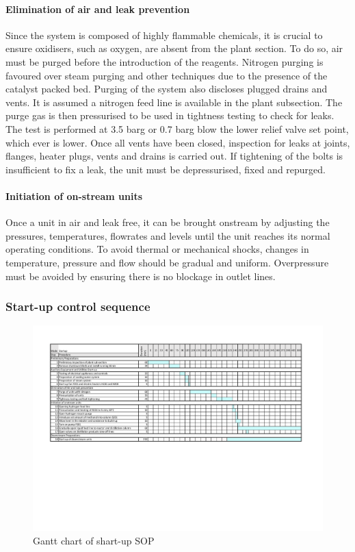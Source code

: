 \paragraph{Elimination of air and leak prevention}
Since the system is composed of highly flammable chemicals, it is crucial to ensure oxidisers, such as oxygen, are absent from the plant section. To do so, air must be purged before the introduction of the reagents. Nitrogen purging is favoured over steam purging and other techniques due to the presence of the catalyst packed bed. Purging of the system also discloses plugged drains and vents. It is assumed a nitrogen feed line is available in the plant subsection. 
The purge gas is then pressurised to be used in tightness testing to check for leaks. The test is performed at 3.5 barg or 0.7 barg blow the lower relief valve set point, which ever is lower. Once all vents have been closed, inspection for leaks at joints, flanges, heater plugs, vents and drains is carried out. If tightening of the bolts is insufficient to fix a leak, the unit must be depressurised, fixed and repurged.

\paragraph{Initiation of on-stream units}
Once a unit in air and leak free, it can be brought onstream by adjusting the pressures, temperatures, flowrates and levels until the unit reaches its normal operating conditions. To avoid thermal or mechanical shocks, changes in temperature, pressure and flow should be gradual and uniform. Overpressure must be avoided by ensuring there is no blockage in outlet lines.


\subsubsection{Start-up control sequence}
\begin{figure}[H]
    \centering
    \includegraphics[clip, trim= 1cm 8cm 1cm 1.5cm, width=\linewidth]{chapters/4-operation-control/4-Figures/Shart-up.pdf}
    \caption{Gantt chart of shart-up SOP}
    \label{fig:startup}
\end{figure}

